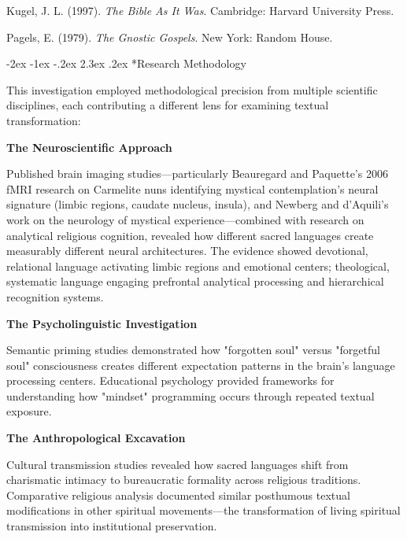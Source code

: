 \documentclass[12pt,twoside]{book}
\makeatletter
\renewcommand\section{\@startsection{section}{1}{\z@}%
{-3.5ex \@plus -1ex \@minus -.2ex}%
{2.3ex \@plus.2ex}%
{\normalfont\Large\bfseries}}
\let\oldsection\section
\renewcommand{\section}[1]{\needspace{4\baselineskip}\oldsection{#1}}
\def\cleardoublepage{\clearpage\if@twoside \ifodd\c@page\else\hbox{}\thispagestyle{empty}\newpage\if@twocolumn\hbox{}\newpage\fi\fi\fi}
\renewcommand\section{\@startsection{section}{1}{\z@}%
{-2ex \@plus -1ex \@minus -.2ex}%
{2.3ex \@plus.2ex}%
{\normalfont\Large\bfseries}}
\makeatother
\begin{document}
Kugel, J. L. (1997). \emph{The Bible As It Was}. Cambridge: Harvard University Press.

Pagels, E. (1979). \emph{The Gnostic Gospels}. New York: Random House.

\cleardoublepage
\vspace*{0.15\textheight}
\section*{Research Methodology}
\thispagestyle{sectionopening}

This investigation employed methodological precision from multiple scientific disciplines, each contributing a different lens for examining textual transformation:

\vspace{0.5cm}

\textbf{\textbf{The Neuroscientific Approach}}

Published brain imaging studies—particularly Beauregard and Paquette's 2006 fMRI research on Carmelite nuns identifying mystical contemplation's neural signature (limbic regions, caudate nucleus, insula), and Newberg and d'Aquili's work on the neurology of mystical experience—combined with research on analytical religious cognition, revealed how different sacred languages create measurably different neural architectures. The evidence showed devotional, relational language activating limbic regions and emotional centers; theological, systematic language engaging prefrontal analytical processing and hierarchical recognition systems.

\vspace{0.5cm}

\textbf{\textbf{The Psycholinguistic Investigation}}

Semantic priming studies demonstrated how "forgotten soul" versus "forgetful soul" consciousness creates different expectation patterns in the brain's language processing centers. Educational psychology provided frameworks for understanding how "mindset" programming occurs through repeated textual exposure.

\clearpage

\textbf{\textbf{The Anthropological Excavation}}

Cultural transmission studies revealed how sacred languages shift from charismatic intimacy to bureaucratic formality across religious traditions. Comparative religious analysis documented similar posthumous textual modifications in other spiritual movements—the transformation of living spiritual transmission into institutional preservation.
\end{document}
